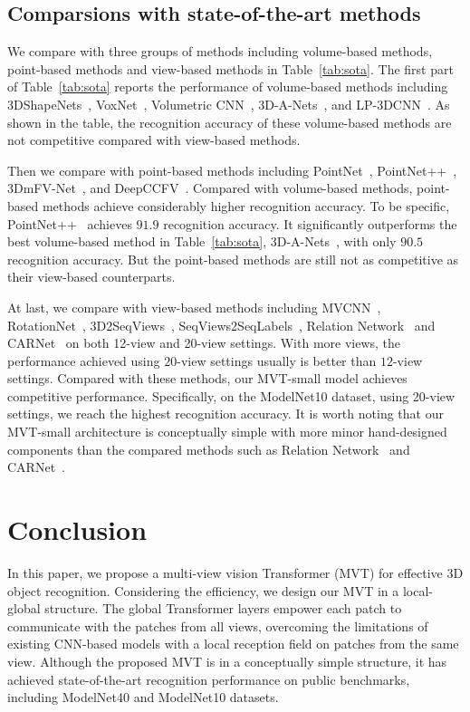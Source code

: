 \documentclass{bmvc2k}
\begin{document}
\subsection{Comparsions with state-of-the-art methods}
We compare with three groups of methods including volume-based methods, point-based methods and view-based methods in Table~\ref{tab:sota}. The first part of  Table~\ref{tab:sota} reports the performance of volume-based methods including 3DShapeNets~\cite{wu20153d}, VoxNet~\cite{maturana2015voxnet}, Volumetric CNN~\cite{qi2016volumetric}, 3D-A-Nets~\cite{ren20173d}, and LP-3DCNN~\cite{LP-3DCNN}. As shown in the table, the recognition accuracy of these volume-based methods are not competitive compared with view-based methods.

Then we compare with point-based methods including PointNet~\cite{pointnet}, PointNet++~\cite{pointnet++}, 3DmFV-Net~\cite{3Dmfv}, and DeepCCFV~\cite{AAAI2019DeepCCFV}. Compared with volume-based methods, point-based methods achieve  considerably higher recognition accuracy. To be specific, PointNet++~\cite{pointnet++} achieves $91.9$ recognition accuracy. It significantly outperforms the best volume-based method in Table~\ref{tab:sota}, 3D-A-Nets~\cite{ren20173d},  with only $90.5$ recognition accuracy. But the point-based methods are still not as competitive as their view-based counterparts.

At last, we compare with view-based methods including MVCNN~\cite{su2015multi}, RotationNet~\cite{kanezaki2018rotationnet}, 3D2SeqViews~\cite{DBLP:journals/tip/HanLLVLZHC19}, SeqViews2SeqLabels~\cite{DBLP:journals/tip/HanSLVLZHC19}, Relation Network~\cite{mvrelations} and CAR\-Net~\cite{DBLP:journals/tip/XuZXQL21} on both 12-view and 20-view settings. 
With more views, the performance achieved using  $20$-view settings usually is better than $12$-view settings. Compared with these methods, our MVT-small model achieves competitive performance. Specifically, on the ModelNet10 dataset, using 20-view settings, we reach the highest recognition accuracy. It is worth noting that our MVT-small architecture is conceptually simple with more minor hand-designed components than the compared methods such as Relation Network~\cite{mvrelations} and CAR\-Net~\cite{DBLP:journals/tip/XuZXQL21}.  

\section{Conclusion}
In this paper, we propose a multi-view vision Transformer (MVT) for effective 3D object recognition. Considering the efficiency, we design our MVT in a local-global structure. The global Transformer layers empower each patch to communicate with the patches from all views, overcoming the limitations of existing CNN-based models with a local reception field on patches from the same view. Although the proposed MVT is in a conceptually simple structure, it has achieved state-of-the-art recognition performance on public benchmarks, including ModelNet40 and ModelNet10 datasets.


\end{document}
